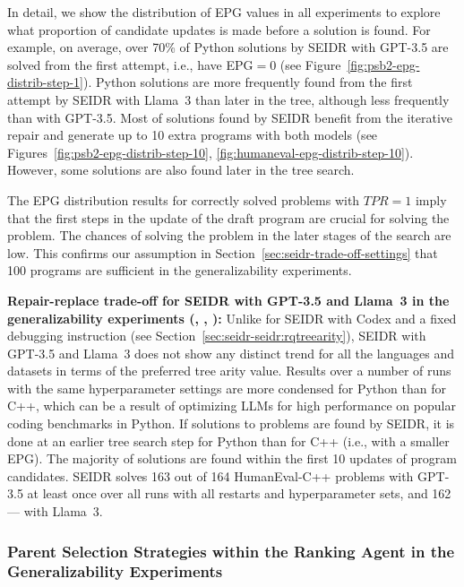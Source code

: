 In detail, we show the distribution of EPG values in all experiments to explore what proportion of candidate updates is made before a solution is found.
For example, on average, over 70\% of Python solutions by SEIDR with GPT-3.5 are solved from the first attempt, i.e., have EPG$=0$ (see Figure~\ref{fig:psb2-epg-distrib-step-1}).
Python solutions are more frequently found from the first attempt by SEIDR with Llama~3 than later in the tree, although less frequently than with GPT-3.5.
Most of solutions found by SEIDR benefit from the iterative repair and generate up to 10 extra programs with both models (see Figures~\ref{fig:psb2-epg-distrib-step-10}, \ref{fig:humaneval-epg-distrib-step-10}). 
However, some solutions are also found later in the tree search. 

The EPG distribution results for correctly solved problems with $TPR=1$ imply that the first steps in the update of the draft program are crucial for solving the problem. 
The chances of solving the problem in the later stages of the search are low.
This confirms our assumption in Section~\ref{sec:seidr-trade-off-settings} that 100 programs are sufficient in the generalizability experiments.

\begin{highlight}
\textbf{Repair-replace trade-off for SEIDR with GPT-3.5 and Llama~3 in the generalizability experiments (\rqtreearity{}, \rqllama{}, \rqmultirun{}):}
Unlike for SEIDR with Codex and a fixed debugging instruction (see Section~\ref{sec:seidr-seidr:rqtreearity}), SEIDR with GPT-3.5 and Llama~3 does not show any distinct trend for all the languages and datasets in terms of the preferred tree arity value. 
Results over a number of runs with the same hyperparameter settings are more condensed for Python than for C++, which can be a result of optimizing LLMs for high performance on popular coding benchmarks in Python.
If solutions to problems are found by SEIDR, it is done at an earlier tree search step for Python than for C++ (i.e., with a smaller EPG). 
The majority of solutions are found within the first 10 updates of program candidates. 
SEIDR solves 163 out of 164 HumanEval-C++ problems with GPT-3.5 at least once over all runs with all restarts and hyperparameter sets, and 162 --- with Llama~3.
\end{highlight}



\subsubsection{Parent Selection Strategies within the Ranking Agent in the Generalizability Experiments}
\label{sec:seidr-lexicase-results}

